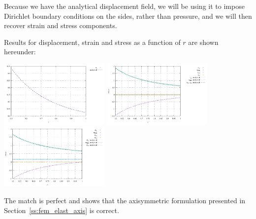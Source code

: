 \begin{center}
\end{center}

Because we have the analytical displacement field, we will be using it to 
impose Dirichlet boundary conditions on the sides, rather than pressure, and 
we will then recover strain and stress components.

Results for displacement, strain and stress as a function of $r$ are shown hereunder:
\begin{center}
\includegraphics[width=5.4cm]{python_codes/fieldstone_90/results/displacement.pdf}
\includegraphics[width=5.4cm]{python_codes/fieldstone_90/results/strain.pdf}
\includegraphics[width=5.4cm]{python_codes/fieldstone_90/results/stress.pdf}
\end{center}
The match is perfect and shows that the axisymmetric formulation presented in Section~\ref{ss:fem_elast_axis} is correct.

